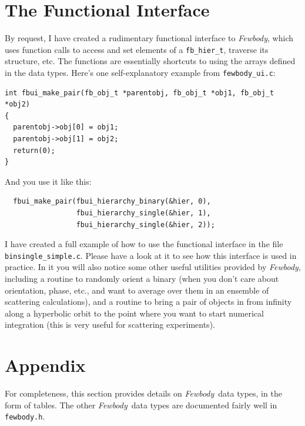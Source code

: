 \documentclass[10pt,preprint]{aastex} %
\newcommand{\Fewbody}{{\em Fewbody\/}}
\begin{document}
\section{The Functional Interface}\label{sec:functional}
By request, I have created a rudimentary functional interface to \Fewbody,
which uses function calls to access and set elements of a {\tt fb\_hier\_t},
traverse its structure, etc.  The functions are essentially shortcuts to
using the arrays defined in the data types.  Here's one self-explanatory example 
from {\tt fewbody\_ui.c}:

\begin{verbatim}
int fbui_make_pair(fb_obj_t *parentobj, fb_obj_t *obj1, fb_obj_t *obj2)
{
  parentobj->obj[0] = obj1;
  parentobj->obj[1] = obj2;
  return(0);
}  
\end{verbatim}

And you use it like this:

\begin{verbatim}
  fbui_make_pair(fbui_hierarchy_binary(&hier, 0),
                 fbui_hierarchy_single(&hier, 1),
                 fbui_hierarchy_single(&hier, 2));
\end{verbatim}

I have created a full example of how to use the functional interface in
the file {\tt binsingle\_simple.c}.  Please have a look at it to see
how this interface is used in practice.  In it you will also notice some 
other useful utilities provided by \Fewbody, including a routine to randomly
orient a binary (when you don't care about orientation, phase, etc., and want
to average over them in an ensemble of scattering calculations), and a routine
to bring a pair of objects in from infinity along a hyperbolic orbit to the point
where you want to start numerical integration (this is very useful for scattering
experiments).

\section{Appendix}\label{sec:appendix}
For completeness, this section provides details on \Fewbody\ data types, in the form
of tables.  The other \Fewbody\ data types are documented fairly well in {\tt fewbody.h}.
\end{document}
